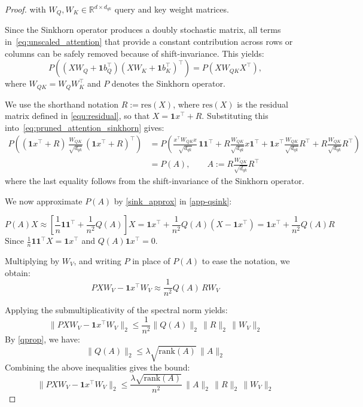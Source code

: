 \documentclass{article}
\theoremstyle{definition}
\theoremstyle{plain}
\begin{document}
\begin{appendices}
\begin{proof}
with $W_{Q}, W_{K} \in \mathbb{R}^{d \times d_{qk}}$ query and key weight matrices.

Since the Sinkhorn operator produces a doubly stochastic matrix, all terms in~\ref{eq:unscaled_attention} that provide a constant contribution across rows or columns can be safely removed because of shift-invariance. This yields:
\begin{equation}
P((X W_Q + \mathbf{1} b_Q^\top)(X W_K + \mathbf{1} b_K^\top)^\top) = P(X W_{QK} X^\top),
\label{eq:pruned_attention_sinkhorn}
\end{equation}
where $W_{QK} = W_Q W_K^\top$ and $P$ denotes the Sinkhorn operator.

We use the shorthand notation $R := \mathrm{res}(X)$, where $\mathrm{res}(X)$ is the residual matrix defined in \ref{equ:residual}, so that $X = \mathbf{1} x^\top + R$. Substituting this into~\ref{eq:pruned_attention_sinkhorn} gives:
\begin{align}
P\left((\mathbf{1} x^\top + R)\,\frac{W_{QK}}{\sqrt{d_{qk}}}\,
(\mathbf{1} x^\top + R)^\top\right) \nonumber &= P\left(\frac{x^\top W_{QK} x}{\sqrt{d_{qk}}}\,\mathbf{1}\mathbf{1}^\top
+ R \frac{W_{QK}}{\sqrt{d_{qk}}} x \mathbf{1}^\top
+ \mathbf{1} x^\top \frac{W_{QK}}{\sqrt{d_{qk}}} R^\top
+ R \frac{W_{QK}}{\sqrt{d_{qk}}} R^\top\right)\\ 
&=P(A), \qquad A:=R \frac{W_{QK}}{\sqrt{d_{qk}}} R^\top\label{eq:A_expansion}
\end{align}
where the last equality follows from the shift-invariance of the Sinkhorn operator.

We now approximate $P(A)$ by \cref{sink_approx} in \cref{app-qsink}: 

\[
P(A)X \approx \left[\frac{1}{n}\mathbf{1}\mathbf{1}^\top+\frac{1}{n^2}Q(A)\right]X=
\mathbf{1}x^\top + \frac{1}{n^2}Q(A)(X - \mathbf{1}x^\top)
= \mathbf{1}x^\top +\frac{1}{n^2} Q(A)R
\]
Since $\frac{1}{n}\mathbf{1}\mathbf{1}^\top X=\mathbf{1}x^\top$ and $Q(A)\mathbf{1}x^\top=0$.

Multiplying by $W_V$, and writing $P$ in place of $P(A)$ to ease the notation, we obtain:
\[
PXW_V - \mathbf{1}x^\top W_V \approx \frac{1}{n^2}Q(A)\,R W_V
\]

Applying the submultiplicativity of the spectral norm yields:
\[
\|PXW_V - \mathbf{1}x^\top W_V\|_2
\le
\frac{1}{n^2}\|Q(A)\|_2\,\|R\|_2\,\|W_V\|_2
\]
By \cref{qprop}, we have:
\[
\|Q(A)\|_2
\le
\lambda \sqrt{\mathrm{rank}(A)}\,\|A\|_2
\]
Combining the above inequalities gives the bound:
\[
\|PXW_V - \mathbf{1}x^\top W_V\|_2
\le
\frac{\lambda \sqrt{\mathrm{rank}(A)}}{n^2}\,
\|A\|_2\,\|R\|_2\,\|W_V\|_2
\]


\end{proof}
\end{appendices}
\end{document}
